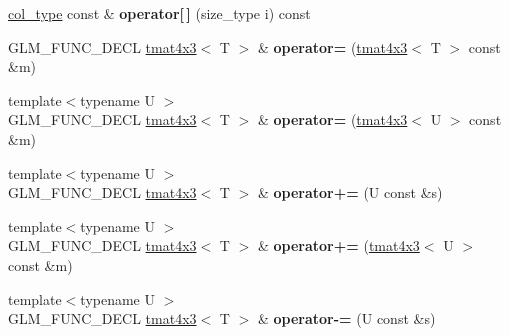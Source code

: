 \begin{DoxyCompactItemize}
\item 
\hypertarget{structglm_1_1detail_1_1tmat4x3_a3c51ea05764cc0449bfd1da1ce552cc0}{\hyperlink{structglm_1_1detail_1_1tvec3}{col\-\_\-type} const \& {\bfseries operator\mbox{[}$\,$\mbox{]}} (size\-\_\-type i) const }\label{structglm_1_1detail_1_1tmat4x3_a3c51ea05764cc0449bfd1da1ce552cc0}

\item 
\hypertarget{structglm_1_1detail_1_1tmat4x3_aa3181a3c75dbb5e906f78d94cd4f8b10}{\-G\-L\-M\-\_\-\-F\-U\-N\-C\-\_\-\-D\-E\-C\-L \hyperlink{structglm_1_1detail_1_1tmat4x3}{tmat4x3}$<$ \-T $>$ \& {\bfseries operator=} (\hyperlink{structglm_1_1detail_1_1tmat4x3}{tmat4x3}$<$ \-T $>$ const \&m)}\label{structglm_1_1detail_1_1tmat4x3_aa3181a3c75dbb5e906f78d94cd4f8b10}

\item 
\hypertarget{structglm_1_1detail_1_1tmat4x3_aa72c676f716423825396e809980da17e}{{\footnotesize template$<$typename U $>$ }\\\-G\-L\-M\-\_\-\-F\-U\-N\-C\-\_\-\-D\-E\-C\-L \hyperlink{structglm_1_1detail_1_1tmat4x3}{tmat4x3}$<$ \-T $>$ \& {\bfseries operator=} (\hyperlink{structglm_1_1detail_1_1tmat4x3}{tmat4x3}$<$ \-U $>$ const \&m)}\label{structglm_1_1detail_1_1tmat4x3_aa72c676f716423825396e809980da17e}

\item 
\hypertarget{structglm_1_1detail_1_1tmat4x3_a01cbaa2678d0a2a8e8506560b250609a}{{\footnotesize template$<$typename U $>$ }\\\-G\-L\-M\-\_\-\-F\-U\-N\-C\-\_\-\-D\-E\-C\-L \hyperlink{structglm_1_1detail_1_1tmat4x3}{tmat4x3}$<$ \-T $>$ \& {\bfseries operator+=} (\-U const \&s)}\label{structglm_1_1detail_1_1tmat4x3_a01cbaa2678d0a2a8e8506560b250609a}

\item 
\hypertarget{structglm_1_1detail_1_1tmat4x3_a2e67f31373b5fef2afa23fcb52526979}{{\footnotesize template$<$typename U $>$ }\\\-G\-L\-M\-\_\-\-F\-U\-N\-C\-\_\-\-D\-E\-C\-L \hyperlink{structglm_1_1detail_1_1tmat4x3}{tmat4x3}$<$ \-T $>$ \& {\bfseries operator+=} (\hyperlink{structglm_1_1detail_1_1tmat4x3}{tmat4x3}$<$ \-U $>$ const \&m)}\label{structglm_1_1detail_1_1tmat4x3_a2e67f31373b5fef2afa23fcb52526979}

\item 
\hypertarget{structglm_1_1detail_1_1tmat4x3_a26b75bbce55ad99351b7011c47c75fef}{{\footnotesize template$<$typename U $>$ }\\\-G\-L\-M\-\_\-\-F\-U\-N\-C\-\_\-\-D\-E\-C\-L \hyperlink{structglm_1_1detail_1_1tmat4x3}{tmat4x3}$<$ \-T $>$ \& {\bfseries operator-\/=} (\-U const \&s)}\label{structglm_1_1detail_1_1tmat4x3_a26b75bbce55ad99351b7011c47c75fef}


\end{DoxyCompactItemize}
